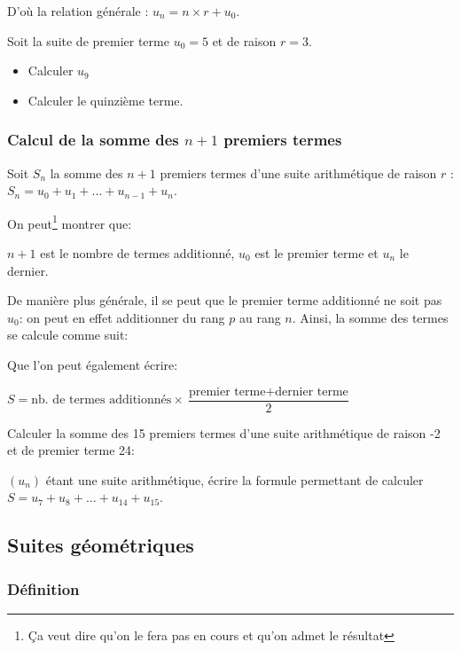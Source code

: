 \documentclass[a4paper,12pt]{scrartcl}
\begin{document}
D'où la relation générale : $u_n = n \times r + u_0$.

\exemple Soit la suite de premier terme $u_0 = 5$ et de raison $r = 3$.

\begin{itemize}
\item Calculer $u_9$
\item Calculer le quinzième terme.
\end{itemize}


\subsubsection{Calcul de la somme des $n+1$ premiers termes}

Soit $S_n$ la somme des $n+1$ premiers termes d'une suite arithmétique de raison $r$ : $S_n = u_0 + u_1 + ... + u_{n-1} + u_n$.

On peut\footnote{Ça veut dire qu'on le fera pas en cours et qu'on admet le résultat} montrer que:


$n+1$ est le nombre de termes additionné, $u_0$ est le premier terme et $u_n$ le dernier.

De manière plus générale, il se peut que le premier terme additionné ne soit pas $u_0$: on peut en effet additionner du rang $p$ au rang $n$. Ainsi, la somme des termes se calcule comme suit:


Que l'on peut également écrire: 

$S = \mbox{nb. de termes additionnés} \times \dfrac{\mbox{premier terme} + \mbox{dernier terme}}{2}$

\exemple Calculer la somme des 15 premiers termes d'une suite arithmétique de raison -2 et de premier terme 24:


\exemple $(u_n)$ étant une suite arithmétique, écrire la formule permettant de calculer $S = u_7 + u_8 + ... + u_{14} + u_{15}$.



\subsection{Suites géométriques}

\subsubsection{Définition}
\end{document}

